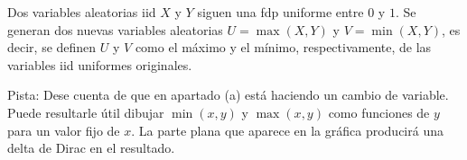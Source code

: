\ifspanish

\question[25] %

Dos variables aleatorias  iid  $X$ y $Y$ siguen una fdp uniforme entre  $0$ y $1$. Se generan dos nuevas variables aleatorias  $U = \max(X,Y)$ y $V = \min(X,Y)$, es decir, se definen $U$ y $V$ como el máximo y el mínimo, respectivamente, de las variables iid uniformes originales.


Pista: Dese cuenta de que en apartado (a)  está haciendo un cambio de variable. Puede resultarle útil dibujar $\min(x,y)$ y $\max(x,y)$ como funciones de $y$ para un valor fijo  de $x$. La parte plana que aparece en la gráfica producirá una delta de Dirac en el resultado.

\begin{solution}
\end{solution}

